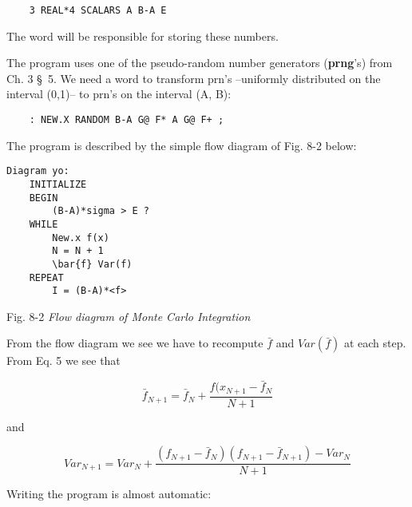 \begin{lstlisting}
    3 REAL*4 SCALARS A B-A E
\end{lstlisting}

The word  will be responsible for storing these numbers.

The program uses one of the pseudo-random number generators (\textbf{prng}’s) from Ch. 3 \S\ 5. We need a word to transform prn's --uniformly distributed on the interval (0,1)-- to prn's on the interval (A, B):

\begin{lstlisting}
    : NEW.X RANDOM B-A G@ F* A G@ F+ ;
\end{lstlisting}

The program is described by the simple flow diagram of Fig. 8-2 below:

\begin{lstlisting}
Diagram yo:
    INITIALIZE
    BEGIN
        (B-A)*sigma > E ?
    WHILE
        New.x f(x)
        N = N + 1
        \bar{f} Var(f)
    REPEAT
        I = (B-A)*<f>
\end{lstlisting}

Fig. 8-2 \textit{Flow diagram of Monte Carlo Integration}

From the flow diagram we see we have to recompute $\bar{f}$ and $Var(\bar{f})$ at each step. From Eq. 5 we see that

\begin{equation}
\bar{f}_{N+1} = \bar{f}_N + \frac{f(x_{N+1} - \bar{f}_{N}}{N + 1}
\end{equation}

and

\begin{equation}
Var_{N+1} = Var_{N} + \frac{(f_{N+1}-\bar{f}_{N})(f_{N+1} - \bar{f}_{N+1})-Var_{N}}{N+1}
\end{equation}

Writing the program is almost automatic:

